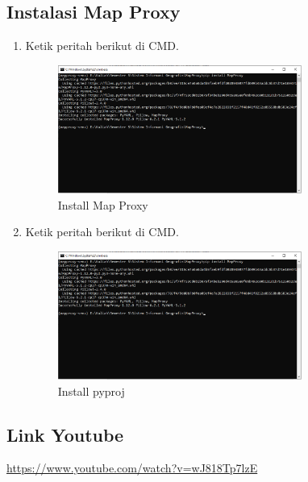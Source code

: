 \subsection{Instalasi Map Proxy}
\begin{enumerate}
	\item  Ketik peritah berikut di CMD.
	\hfill\break
	\begin{figure}[H]
		\includegraphics[width=8cm]{figures/1174006/4/11.png}
		\centering
		\caption{Install Map Proxy}
	\end{figure}
	\item  Ketik peritah berikut di CMD.
	\hfill\break
	\begin{figure}[H]
		\includegraphics[width=8cm]{figures/1174006/4/11.png}
		\centering
		\caption{Install pyproj}
	\end{figure}
\end{enumerate}
\subsection{Link Youtube}
\href{https://www.youtube.com/watch?v=wJ818Tp7lzE}{https://www.youtube.com/watch?v=wJ818Tp7lzE}